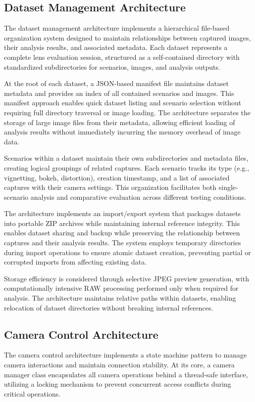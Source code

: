 \subsection{Dataset Management Architecture}
The dataset management architecture implements a hierarchical file-based organization system designed to maintain relationships between captured images, their analysis results, and associated metadata. Each dataset represents a complete lens evaluation session, structured as a self-contained directory with standardized subdirectories for scenarios, images, and analysis outputs.

At the root of each dataset, a JSON-based manifest file maintains dataset metadata and provides an index of all contained scenarios and images. This manifest approach enables quick dataset listing and scenario selection without requiring full directory traversal or image loading. The architecture separates the storage of large image files from their metadata, allowing efficient loading of analysis results without immediately incurring the memory overhead of image data.

Scenarios within a dataset maintain their own subdirectories and metadata files, creating logical groupings of related captures. Each scenario tracks its type (e.g., vignetting, bokeh, distortion), creation timestamp, and a list of associated captures with their camera settings. This organization facilitates both single-scenario analysis and comparative evaluation across different testing conditions.

The architecture implements an import/export system that packages datasets into portable ZIP archives while maintaining internal reference integrity. This enables dataset sharing and backup while preserving the relationship between captures and their analysis results. The system employs temporary directories during import operations to ensure atomic dataset creation, preventing partial or corrupted imports from affecting existing data.

Storage efficiency is considered through selective JPEG preview generation, with computationally intensive RAW processing performed only when required for analysis. The architecture maintains relative paths within datasets, enabling relocation of dataset directories without breaking internal references.

\subsection{Camera Control Architecture}
The camera control architecture implements a state machine pattern to manage camera interactions and maintain connection stability. At its core, a camera manager class encapsulates all camera operations behind a thread-safe interface, utilizing a locking mechanism to prevent concurrent access conflicts during critical operations.

